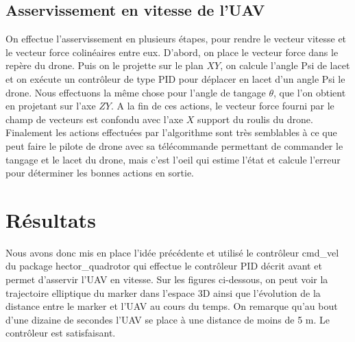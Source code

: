 \subsection{Asservissement en vitesse de l'UAV}
On effectue l’asservissement en plusieurs étapes, pour rendre le vecteur vitesse et le vecteur force colinéaires entre eux. 
D’abord, on place le vecteur force dans le repère du drone. Puis on le projette sur le plan $XY$, on calcule l’angle Psi de lacet et on exécute un contrôleur de type PID pour déplacer en lacet d’un angle Psi le drone. 
Nous effectuons la même chose pour l’angle de tangage $\theta$, que l’on obtient en projetant sur l’axe $ZY$. 
A la fin de ces actions, le vecteur force fourni par le champ de vecteurs est confondu avec l’axe $X$ 
support du roulis du drone. Finalement les actions effectuées par l’algorithme sont très semblables 
à ce que peut faire le pilote de drone avec sa télécommande permettant de commander le tangage et le lacet du drone, 
mais c’est l'oeil qui estime l’état et calcule l’erreur pour déterminer les bonnes actions en sortie. 


\section{Résultats}

Nous avons donc mis en place l’idée précédente et utilisé le contrôleur cmd\_vel
du package hector\_quadrotor qui effectue le contrôleur PID décrit avant et permet d’asservir l’UAV en vitesse.
Sur les figures ci-dessous, on peut voir la trajectoire elliptique du marker dans l’espace 3D ainsi que 
l’évolution de la distance entre le marker et l’UAV au cours du temps. 
On remarque qu’au bout d’une dizaine de secondes l’UAV se place à une distance de moins de 5 m. 
Le contrôleur est satisfaisant. 
